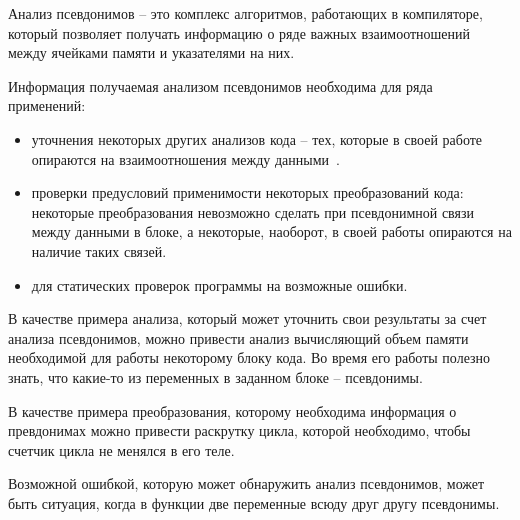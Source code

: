 





\Intro


\begin{mydefinition}
Анализ псевдонимов -- это комплекс алгоритмов, работающих в компиляторе, который позволяет получать информацию о ряде важных взаимоотношений между ячейками памяти и указателями на них.
\end{mydefinition}

Информация получаемая анализом псевдонимов необходима для ряда применений:
\begin{itemize}
\item уточнения некоторых других анализов кода -- тех, которые в своей работе опираются на взаимоотношения между данными~\autocite{Voevodin}.
\item проверки предусловий применимости некоторых преобразований кода:  некоторые преобразования невозможно сделать при псевдонимной связи между данными в блоке, а некоторые, наоборот, в своей работы опираются на наличие таких связей.
\item для статических проверок программы на возможные ошибки.
\end{itemize}

\begin{myexampless}
В качестве примера анализа, который может уточнить свои результаты за счет анализа псевдонимов, можно привести анализ вычисляющий объем памяти необходимой для работы некоторому блоку кода. Во время его работы полезно знать, что какие-то из переменных в заданном блоке -- псевдонимы.

В качестве примера преобразования, которому необходима информация о превдонимах можно привести раскрутку цикла, которой необходимо, чтобы счетчик цикла не менялся в его теле.

Возможной ошибкой, которую может обнаружить анализ псевдонимов, может быть ситуация, когда в функции две переменные всюду друг другу псевдонимы.
\end{myexampless}


